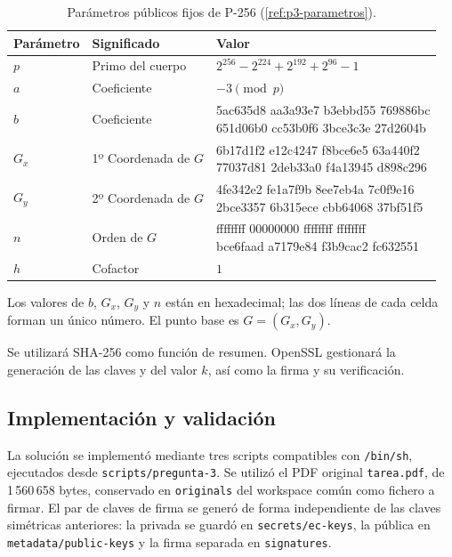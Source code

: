 \begin{table}[H]
  \centering
  \caption{Parámetros públicos fijos de P-256 (\ref{ref:p3-parametros}).}
  \label{tab:p3-parametros-p256}
  \begingroup
  \small
  \renewcommand{\arraystretch}{1.35}
  \begin{tabularx}{\textwidth}{@{}l l X@{}}
    \toprule
    \textbf{Parámetro} & \textbf{Significado} & \textbf{Valor} \\
    \midrule
$p$ & Primo del cuerpo & $2^{256}-2^{224}+2^{192}+2^{96}-1$ \\
    $a$ & Coeficiente & $-3\pmod p$ \\
    $b$ & Coeficiente & \shortstack[l]{\ttfamily\footnotesize 5ac635d8 aa3a93e7 b3ebbd55 769886bc\\
\ttfamily\footnotesize 651d06b0 cc53b0f6 3bce3c3e 27d2604b} \\
    $G_x$ & 1º Coordenada de $G$ & \shortstack[l]{\ttfamily\footnotesize 6b17d1f2 e12c4247 f8bce6e5 63a440f2\\
\ttfamily\footnotesize 77037d81 2deb33a0 f4a13945 d898c296} \\
    $G_y$ & 2º Coordenada de $G$ & \shortstack[l]{\ttfamily\footnotesize 4fe342e2 fe1a7f9b 8ee7eb4a 7c0f9e16\\
\ttfamily\footnotesize 2bce3357 6b315ece cbb64068 37bf51f5} \\
    $n$ & Orden de $G$ & \shortstack[l]{\ttfamily\footnotesize ffffffff 00000000 ffffffff ffffffff\\
\ttfamily\footnotesize bce6faad a7179e84 f3b9cac2 fc632551} \\
    $h$ & Cofactor & $1$ \\
    \bottomrule
  \end{tabularx}
  \endgroup

  \vspace{3pt}
  \parbox{\textwidth}{\footnotesize Los valores de $b$, $G_x$, $G_y$ y $n$ están en hexadecimal; las dos líneas de cada celda forman un único número. El punto base es $G=(G_x,G_y)$.}
\end{table}

Se utilizará SHA-256 como función de resumen. OpenSSL gestionará la generación de las claves y del valor $k$, así como la firma y su verificación.


\subsection{Implementación y validación}

La solución se implementó mediante tres scripts compatibles con \texttt{/bin/sh}, ejecutados desde \texttt{scripts/pregunta-3}. Se utilizó el PDF original \texttt{tarea.pdf}, de 1\,560\,658 bytes, conservado en \texttt{originals} del workspace común como fichero a firmar.
El par de claves de firma se generó de forma independiente de las claves simétricas anteriores: la privada se guardó en \texttt{secrets/ec-keys}, la pública en \texttt{metadata/public-keys} y la firma separada en \texttt{signatures}.

